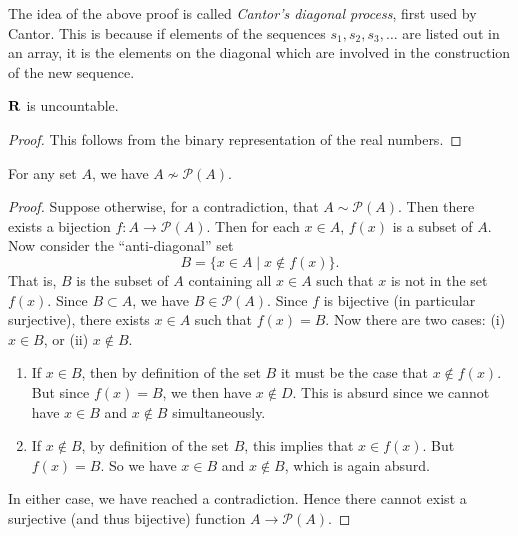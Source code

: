 \begin{remark}
The idea of the above proof is called \emph{Cantor's diagonal process}, first used by Cantor. This is because if elements of the sequences $s_1,s_2,s_3,\dots$ are listed out in an array, it is the elements on the diagonal which are involved in the construction of the new sequence.
\end{remark}

\begin{corollary}
$\mathbf R$ is uncountable.
\end{corollary}

\begin{proof}
This follows from the binary representation of the real numbers.
\end{proof}

\begin{theorem}
For any set $A$, we have $A\not\sim\mathcal{P}(A)$.
\end{theorem}

\begin{proof}
Suppose otherwise, for a contradiction, that $A\sim\mathcal{P}(A)$. Then there exists a bijection $f:A\to\mathcal{P}(A)$. Then for each $x\in A$, $f(x)$ is a subset of $A$. Now consider the ``anti-diagonal'' set
\[B=\{x\in A\mid x\notin f(x)\}.\]
That is, $B$ is the subset of $A$ containing all $x\in A$ such that $x$ is not in the set $f(x)$. Since $B\subset A$, we have $B\in\mathcal{P}(A)$. Since $f$ is bijective (in particular surjective), there exists $x\in A$ such that $f(x)=B$. Now there are two cases: (i) $x\in B$, or (ii) $x\notin B$.
\begin{enumerate}[label=(\roman*)]
\item If $x\in B$, then by definition of the set $B$ it must be the case that $x\notin f(x)$. But since $f(x)=B$, we then have $x\notin D$. This is absurd since we cannot have $x\in B$ and $x\notin B$ simultaneously.
\item If $x\notin B$, by definition of the set $B$, this implies that $x\in f(x)$. But $f(x)=B$. So we have $x\in B$ and $x\notin B$, which is again absurd.
\end{enumerate}
In either case, we have reached a contradiction. Hence there cannot exist a surjective (and thus bijective) function $A\to\mathcal{P}(A)$.
\end{proof}
\pagebreak

